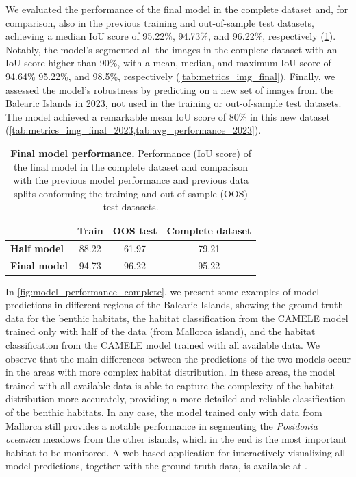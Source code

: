 We evaluated the performance of the final model in the complete dataset and,
for comparison, also in the previous training and out-of-sample test datasets,
achieving a median IoU score of 95.22\%, 94.73\%, and 96.22\%, respectively
(\cref{tab:my-table}). Notably, the model's segmented all the images in the
complete dataset with an IoU score higher than 90\%, with a mean, median, and
maximum IoU score of 94.64\% 95.22\%, and 98.5\%, respectively
(\cref{tab:metrics_img_final}). Finally, we assessed the model's robustness by
predicting on a new set of images from the Balearic Islands in 2023, not used
in the training or out-of-sample test datasets. The model achieved a remarkable
mean IoU score of 80\% in this new dataset
(\cref{tab:metrics_img_final_2023,tab:avg_performance_2023}).

\begin{table}[H]
    \centering
    \caption[Final model performance]{\textbf{Final model performance.}
        Performance (IoU score) of the final model in the complete dataset
        and
        comparison with the previous model performance and previous data splits
        conforming the training and out-of-sample (OOS) test datasets.}
    \label{tab:my-table}
    \begin{tabular}{lccc}
        \hline
                             & \textbf{Train}
                             &
        \textbf{OOS test}    &
        \textbf{Complete
            dataset}
        \\
        \hline
        \textbf{Half model}  & 88.22
                             & 61.97          &
        79.21
        \\
        \textbf{Final model} & 94.73
                             & 96.22          &
        95.22
        \\\hline
    \end{tabular}
\end{table}

In \cref{fig:model_performance_complete}, we present some examples of model
predictions in different regions of the Balearic Islands, showing the
ground-truth data for the benthic habitats, the habitat classification from
the CAMELE model trained only with half of the data (from Mallorca island), and
the habitat classification from the CAMELE model trained with all available
data. We observe that the main differences between the predictions of the two
models occur in the areas with more complex habitat distribution. In these
areas, the model trained with all available data is able to capture the
complexity of the habitat distribution more accurately, providing a more
detailed and reliable classification of the benthic habitats. In any case, the
model trained only with data from Mallorca still provides a notable performance
in segmenting the \textit{Posidonia oceanica} meadows from the other islands,
which in the end is the most important habitat to be monitored. A web-based
application for interactively visualizing all model predictions, together
with the ground truth data, is available at \cite{Webpage_camele}.

